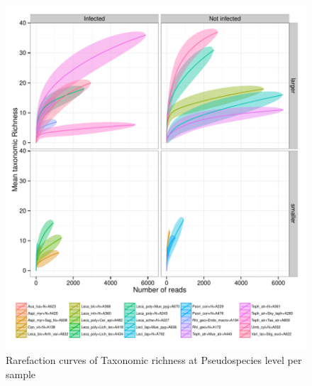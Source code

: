 \documentclass[a4paper, 11]{article}\usepackage[]{graphicx}\usepackage[]{color}
\makeatletter
\def\maxwidth{ %
  \ifdim\Gin@nat@width>\linewidth
    \linewidth
  \else
    \Gin@nat@width
  \fi
}
\newenvironment{knitrout}{}{} %
\makeatother
\begin{document}
\begin{knitrout}
\color{fgcolor}\begin{figure}[H]
\includegraphics[width=\maxwidth]{figure/rarefact_species-1} \caption[Rarefaction curves of Taxonomic richness at Pseudospecies level per sample]{Rarefaction curves of Taxonomic richness at Pseudospecies level per sample}\label{fig:rarefact_species}
\end{figure}


\end{knitrout}
\end{document}
